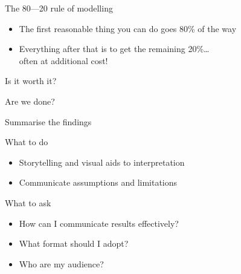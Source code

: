 {
\begin{frame}{The 80---20 rule of modelling}
    \begin{itemize}
        \item The first reasonable thing you can do goes 80\% of the way
        \item Everything after that is to get the remaining 20\%\ldots \\
              often at additional cost!
    \end{itemize}
    \vfill\pause
    \begin{center}
        \Large%
        Is it worth it?
    \end{center}
\end{frame}}

\begin{frame}
    \begin{center}
        \LARGE%
        Are we done?
    \end{center}
\end{frame}

\begin{frame}[t]{Summarise the findings}
    \begin{block}{What to do}
        \begin{itemize}
            \item Storytelling and visual aids to interpretation
            \item Communicate assumptions and limitations
        \end{itemize}
    \end{block}
    \vfill\pause
    \begin{block}{What to ask}
        \begin{itemize}
            \item How can I communicate results effectively?
            \item What format should I adopt?
            \item Who are my audience?
        \end{itemize}
    \end{block}
\end{frame}

